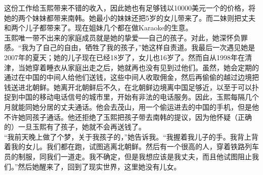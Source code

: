 这份工作给玉熙带来不错的收入，因此她也有足够钱以10000美元一个的价格，将她的两个妹妹都带来南韩。她最小的妹妹还把5岁的女儿带来了。而二妹则把丈夫和两个儿子都带来了。现在姐妹几个都在做Karaoke的生意。\\

玉熙唯一带不出来的家庭成员就是她的挚爱──自己的孩子。对此，她深怀负罪感。“我为了自己的自由，牺牲了我的孩子，”她这样自责道。我最后一次遇见她是2007年的夏天；她的儿子现在已经18岁了，女儿也16岁了。然而自从1998年在清津，当她穿着睡衣从家庭出走之后，她就再也没有见到过他们。虽然，她会定期的通过在中国的中间人给他们送钱，这些中间人收取佣金，然后再偷偷的越过边境把钱送进北朝鲜。她离开北朝鲜后不久，在北朝鲜边境离中国足够近，以至于可以扑捉到中国的移动电话信号的城市里，开始有非法的电话服务。因此，玉熙每隔几个月就能同她分居的丈夫通话。他会去茂山，用一个偷运进去的中国的手机，但是他不许她同孩子通话。他还拒绝了玉熙把孩子带去南韩的提议，因为他怀疑（正确的）一旦玉熙有了孩子，她就不会再送钱了。\\

“我前天晚上做了个梦，关于我孩子的，”她告诉我。“我握着我儿子的手。我背上背着我的女儿。我们都在跑，试图逃离北朝鲜。然后有一个很高的人，穿着铁路列车员的制服，同我们一道走。我不确定，但是我想应该是我丈夫，而且他试图阻止我们。”然后她醒来了，回到了现实世界，这里她没有儿女。\\
